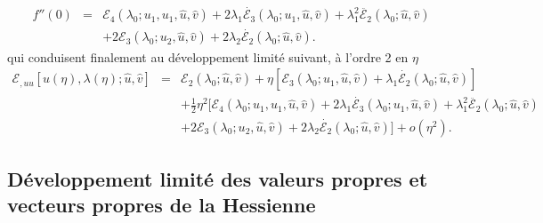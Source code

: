 \documentclass{article}
\newcommand{\nobracket}{}
\newcommand{\nocomma}{}
\newcommand{\nosymbol}{}
\begin{document}
\begin{eqnarray}
  f'' (0) & = & \mathcal{E}_4 (\lambda_0 ; u_1, u_1, \hat{u}, \hat{v}) + 2
  \lambda_1  \dot{\mathcal{E}_3} (\lambda_0 ; u_1, \hat{u}, \hat{v}) +
  \lambda_1^2  \ddot{\mathcal{E}_2} (\lambda_0 ; \hat{u}, \hat{v}) \nonumber\\
  &  & \nosymbol + 2\mathcal{E}_3 (\lambda_0 ; u_2, \hat{u}, \hat{v}) + 2
  \lambda_2  \dot{\mathcal{E}_2} (\lambda_0 ; \hat{u}, \hat{v}) . 
\end{eqnarray}
qui conduisent finalement au d{\'e}veloppement limit{\'e} suivant, {\`a}
l'ordre 2 en $\eta$
\begin{eqnarray}
  \mathcal{E}_{, u \nocomma u} [u (\eta), \lambda (\eta) ; \hat{u}, \hat{v}] &
  = & \mathcal{E}_2 (\lambda_0 ; \hat{u}, \hat{v}) + \eta [\mathcal{E}_3
  (\lambda_0 ; u_1, \hat{u}, \hat{v}) \nobracket \nobracket + \lambda_1 
  \dot{\mathcal{E}_2} (\lambda_0 ; \hat{u}, \hat{v})] \nonumber\\
  &  & \nosymbol + \tfrac{1}{2} \eta^2  [\mathcal{E}_4 (\lambda_0 ; u_1, u_1,
  \hat{u}, \hat{v}) \nobracket + 2 \lambda_1  \dot{\mathcal{E}_3} (\lambda_0 ;
  u_1, \hat{u}, \hat{v}) + \lambda_1^2  \ddot{\mathcal{E}_2} (\lambda_0 ;
  \hat{u}, \hat{v}) \nonumber\\
  &  & \nosymbol \nobracket + 2\mathcal{E}_3 (\lambda_0 ; u_2, \hat{u},
  \hat{v}) + 2 \lambda_2  \dot{\mathcal{E}_2} (\lambda_0 ; \hat{u}, \hat{v})]
  + o (\eta^2) . 
\end{eqnarray}

\subsection{D{\'e}veloppement limit{\'e} des valeurs propres et vecteurs
propres de la Hessienne}
\end{document}
